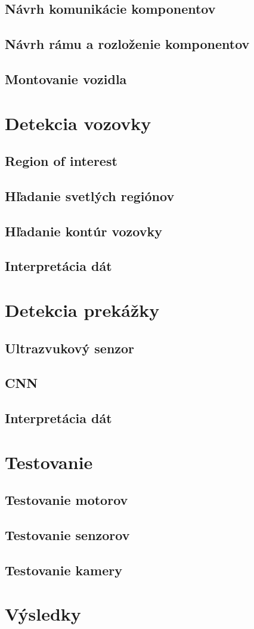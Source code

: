 \subsection{Návrh komunikácie komponentov}
\subsection{Návrh rámu a rozloženie komponentov}
\subsection{Montovanie vozidla}

\section{Detekcia vozovky}\label{sec:DetekciaVozovky}
\subsection{Region of interest}
\subsection{Hľadanie svetlých regiónov}
\subsection{Hľadanie kontúr vozovky}
\subsection{Interpretácia dát}

\section{Detekcia prekážky}\label{sec:DetekciaPrekazky}
\subsection{Ultrazvukový senzor}
\subsection{CNN}
\subsection{Interpretácia dát}

\section{Testovanie}\label{sec:Testovanie}
\subsection{Testovanie motorov}
\subsection{Testovanie senzorov}
\subsection{Testovanie kamery}

\section{Výsledky}\label{sec:Vysledky}
